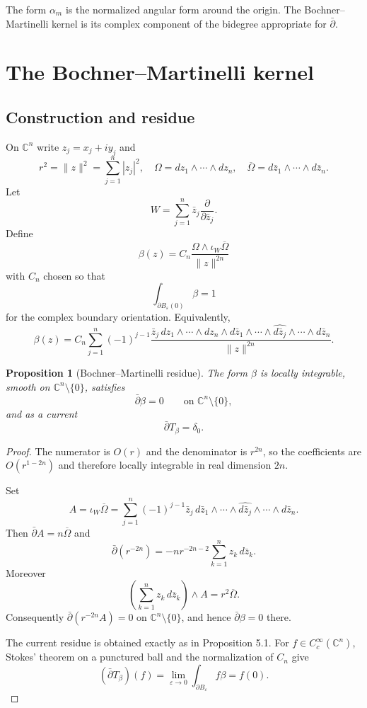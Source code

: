 \documentclass[11pt,a4paper]{article}
\newtheorem{proposition}[theorem]{Proposition}
\theoremstyle{definition}
\theoremstyle{remark}
\newcommand{\C}{\mathbb C}
\newcommand{\ddbar}{\bar\partial}
\newcommand{\Om}{\Omega}
\begin{document}
The form $\alpha_m$ is the normalized angular form around the origin. The Bochner--Martinelli kernel is its complex component of the bidegree appropriate for $\bar\partial$.

\section{The Bochner--Martinelli kernel}

\subsection{Construction and residue}

On $\C^n$ write $z_j=x_j+iy_j$ and
\[
r^2=\|z\|^2=\sum_{j=1}^n|z_j|^2,
\quad
\Om=dz_1\wedge\cdots\wedge dz_n,
\quad
\overline\Om=d\bar z_1\wedge\cdots\wedge d\bar z_n.
\]
Let
\[
W=\sum_{j=1}^n\bar z_j\frac\partial{\partial\bar z_j}.
\]
Define
\[
\beta(z)=C_n\frac{\Om\wedge\iota_W\overline\Om}{\|z\|^{2n}}
\]
with $C_n$ chosen so that
\[
\int_{\partial B_\varepsilon(0)}\beta=1
\]
for the complex boundary orientation. Equivalently,
\[
\beta(z)=C_n\sum_{j=1}^n(-1)^{j-1}
\frac{\bar z_j\,dz_1\wedge\cdots\wedge dz_n\wedge
 d\bar z_1\wedge\cdots\wedge\widehat{d\bar z_j}\wedge\cdots\wedge d\bar z_n}
{\|z\|^{2n}}.
\]

\begin{proposition}[Bochner--Martinelli residue]
The form $\beta$ is locally integrable, smooth on $\C^n\setminus\{0\}$, satisfies
\[
\ddbar\beta=0\qquad\text{on }\C^n\setminus\{0\},
\]
and as a current
\[
\ddbar T_\beta=\delta_0.
\]
\end{proposition}

\begin{proof}
The numerator is $O(r)$ and the denominator is $r^{2n}$, so the coefficients are $O(r^{1-2n})$ and therefore locally integrable in real dimension $2n$.

Set
\[
A=\iota_W\overline\Om
=\sum_{j=1}^n(-1)^{j-1}\bar z_j\,
 d\bar z_1\wedge\cdots\wedge\widehat{d\bar z_j}\wedge\cdots\wedge d\bar z_n.
\]
Then $\ddbar A=n\overline\Om$ and
\[
\ddbar(r^{-2n})=-nr^{-2n-2}\sum_{k=1}^n z_k\,d\bar z_k.
\]
Moreover
\[
\left(\sum_{k=1}^n z_k\,d\bar z_k\right)\wedge A=r^2\overline\Om.
\]
Consequently $\ddbar(r^{-2n}A)=0$ on $\C^n\setminus\{0\}$, and hence $\ddbar\beta=0$ there.

The current residue is obtained exactly as in Proposition 5.1. For $f\in C_c^\infty(\C^n)$, Stokes' theorem on a punctured ball and the normalization of $C_n$ give
\[
(\ddbar T_\beta)(f)=\lim_{\varepsilon\to0}
\int_{\partial B_\varepsilon}f\beta=f(0).
\]
\end{proof}
\end{document}
